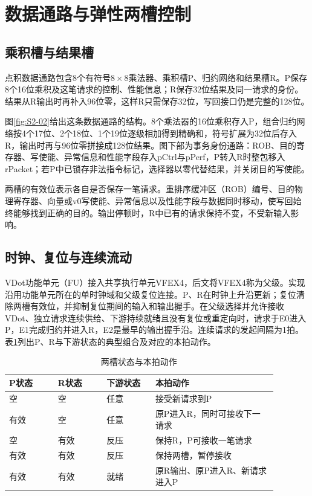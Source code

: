 \section{数据通路与弹性两槽控制}\label{sec:2-datapath}
\subsection{乘积槽与结果槽}
点积数据通路包含8个有符号$8\times8$乘法器、乘积槽P、归约网络和结果槽R。P保存8个16位乘积及这笔请求的控制、性能信息；R保存32位结果及同一请求的身份。结果从R输出时再补入96位零，这样R只需保存32位，写回接口仍是完整的128位。

图\ref{fig:S2-02}给出这条数据通路的结构。8个乘法器的16位乘积存入P，组合归约网络按4个17位、2个18位、1个19位逐级相加得到精确和，符号扩展为32位后存入R，输出时再与96位零拼接成128位结果。图下部为事务身份通路：ROB、目的寄存器、写使能、异常信息和性能字段存入pCtrl与pPerf，P转入R时整包移入rPacket；若P中已锁存非法指令标记，选择器以零代替结果，并关闭目的写使能。


两槽的有效位表示各自是否保存一笔请求。重排序缓冲区（ROB）编号、目的物理寄存器、向量或v0写使能、异常信息以及性能字段与数据同时移动，使写回始终能够找到正确的目的。输出停顿时，R中已有的请求保持不变，不受新输入影响。

\subsection{时钟、复位与连续流动}
VDot功能单元（FU）接入共享执行单元VFEX4，后文将VFEX4称为父级。实现沿用功能单元所在的单时钟域和父级复位连接。P、R在时钟上升沿更新；复位清除两槽有效位，并抑制复位期间的输入和输出握手。在父级选择并允许接收VDot、独立请求连续供给、下游持续就绪且没有复位或重定向时，请求于E0进入P，E1完成归约并进入R，E2是最早的输出握手沿。连续请求的发起间隔为1拍。表\ref{tab:s2-slot-actions}列出P、R与下游状态的典型组合及对应的本拍动作。

\begin{table}[!htbp]\centering
\small
\caption{两槽状态与本拍动作}\label{tab:s2-slot-actions}
\begin{tabular}{p{0.16\linewidth}p{0.16\linewidth}p{0.16\linewidth}p{0.40\linewidth}}
\toprule
P状态 & R状态 & 下游状态 & 本拍动作\\
\midrule
空 & 空 & 任意 & 接受新请求到P\\
有效 & 空 & 任意 & 原P进入R，同时可接收下一请求\\
空 & 有效 & 反压 & 保持R，P可接收一笔请求\\
有效 & 有效 & 反压 & 保持两槽，暂停接收\\
有效 & 有效 & 就绪 & 原R输出、原P进入R、新请求进入P\\
\bottomrule
\end{tabular}
\end{table}

